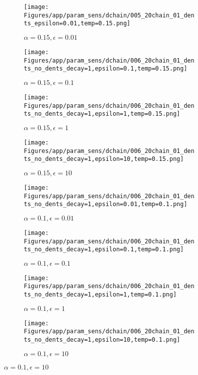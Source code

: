 \documentclass{article}
\theoremstyle{plain}
\begin{document}
\begin{appendices}
\begin{figure}
                \begin{subfigure}[b]{0.24\textwidth}
                    \centering
                    \texttt{[image: Figures/app/param\_sens/dchain/005\_20chain\_01\_dents\_epsilon=0.01,temp=0.15.png]}
                    \caption*{$\alpha=0.15,\epsilon=0.01$}
                \end{subfigure}
                \begin{subfigure}[b]{0.24\textwidth}
                    \centering
                    \texttt{[image: Figures/app/param\_sens/dchain/006\_20chain\_01\_dents\_no\_dents\_decay=1,epsilon=0.1,temp=0.15.png]}
                    \caption*{$\alpha=0.15,\epsilon=0.1$}
                \end{subfigure}
                \begin{subfigure}[b]{0.24\textwidth}
                    \centering
                    \texttt{[image: Figures/app/param\_sens/dchain/006\_20chain\_01\_dents\_no\_dents\_decay=1,epsilon=1,temp=0.15.png]}
                    \caption*{$\alpha=0.15,\epsilon=1$}
                \end{subfigure}
                \begin{subfigure}[b]{0.24\textwidth}
                    \centering
                    \texttt{[image: Figures/app/param\_sens/dchain/006\_20chain\_01\_dents\_no\_dents\_decay=1,epsilon=10,temp=0.15.png]}
                    \caption*{$\alpha=0.15,\epsilon=10$}
                \end{subfigure}
                
                \begin{subfigure}[b]{0.24\textwidth}
                    \centering
                    \texttt{[image: Figures/app/param\_sens/dchain/006\_20chain\_01\_dents\_no\_dents\_decay=1,epsilon=0.01,temp=0.1.png]}
                    \caption*{$\alpha=0.1,\epsilon=0.01$}
                \end{subfigure}
                \begin{subfigure}[b]{0.24\textwidth}
                    \centering
                    \texttt{[image: Figures/app/param\_sens/dchain/006\_20chain\_01\_dents\_no\_dents\_decay=1,epsilon=0.1,temp=0.1.png]}
                    \caption*{$\alpha=0.1,\epsilon=0.1$}
                \end{subfigure}
                \begin{subfigure}[b]{0.24\textwidth}
                    \centering
                    \texttt{[image: Figures/app/param\_sens/dchain/006\_20chain\_01\_dents\_no\_dents\_decay=1,epsilon=1,temp=0.1.png]}
                    \caption*{$\alpha=0.1,\epsilon=1$}
                \end{subfigure}
                \begin{subfigure}[b]{0.24\textwidth}
                    \centering
                    \texttt{[image: Figures/app/param\_sens/dchain/006\_20chain\_01\_dents\_no\_dents\_decay=1,epsilon=10,temp=0.1.png]}
                    \caption*{$\alpha=0.1,\epsilon=10$}
                \end{subfigure}
                

\end{figure}
\end{appendices}
\end{document}
